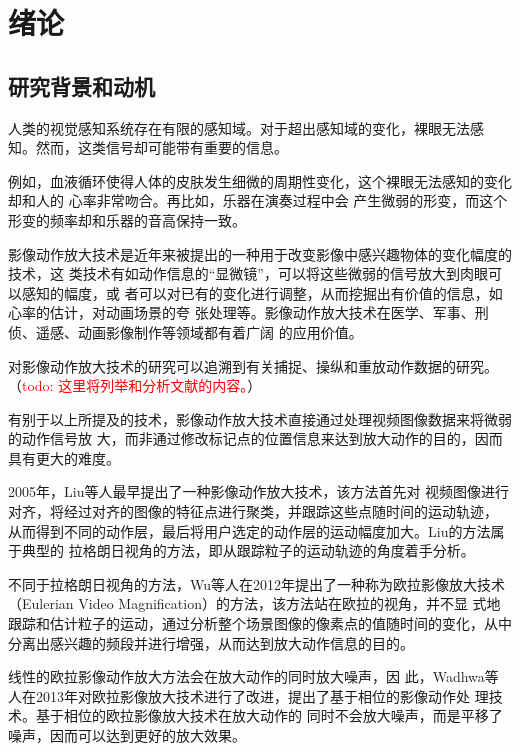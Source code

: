 \chapter{绪论}

\section{研究背景和动机}

人类的视觉感知系统存在有限的感知域。对于超出感知域的变化，裸眼无法感
知。然而，这类信号却可能带有重要的信息。

例如，血液循环使得人体的皮肤发生细微的周期性变化，这个裸眼无法感知的变化却和人的
心率非常吻合。再比如，乐器在演奏过程中会
产生微弱的形变，而这个形变的频率却和乐器的音高保持一致。

影像动作放大技术是近年来被提出的一种用于改变影像中感兴趣物体的变化幅度的技术，这
类技术有如动作信息的“显微镜”，可以将这些微弱的信号放大到肉眼可以感知的幅度，或
者可以对已有的变化进行调整，从而挖掘出有价值的信息，如心率的估计，对动画场景的夸
张处理等。影像动作放大技术在医学、军事、刑侦、遥感、动画影像制作等领域都有着广阔
的应用价值。

对影像动作放大技术的研究可以追溯到有关捕捉、操纵和重放动作数据的研究。（\textcolor{red}{todo: 这里将列举和分析文献\cite{wang1994representing,Unuma1995,Gleicher1998,Lee2002,Brand2000,Pullen2002,Li2002,Jojic2001,brostow1999motion}的内容。}）

有别于以上所提及的技术，影像动作放大技术直接通过处理视频图像数据来将微弱的动作信号放
大，而非通过修改标记点的位置信息来达到放大动作的目的，因而具有更大的难度。

2005年，Liu等人最早提出了一种影像动作放大技术，该方法首先对
视频图像进行对齐，将经过对齐的图像的特征点进行聚类，并跟踪这些点随时间的运动轨迹，
从而得到不同的动作层，最后将用户选定的动作层的运动幅度加大。Liu的方法属于典型的
拉格朗日视角的方法，即从跟踪粒子的运动轨迹的角度着手分析。

不同于拉格朗日视角的方法，Wu等人在2012年提出了一种称为欧拉影像放大技术（Eulerian
Video Magnification）的方法，该方法站在欧拉的视角，并不显
式地跟踪和估计粒子的运动，通过分析整个场景图像的像素点的值随时间的变化，从中
分离出感兴趣的频段并进行增强，从而达到放大动作信息的目的。

线性的欧拉影像动作放大方法会在放大动作的同时放大噪声，因
此，Wadhwa等人在2013年对欧拉影像放大技术进行了改进，提出了基于相位的影像动作处
理技术。基于相位的欧拉影像放大技术在放大动作的
同时不会放大噪声，而是平移了噪声，因而可以达到更好的放大效果。

